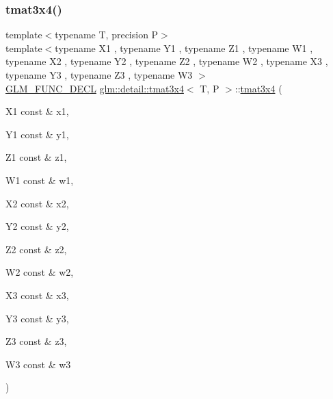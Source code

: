 \subsubsection{\texorpdfstring{tmat3x4()}{tmat3x4()}\hspace{0.1cm}{\footnotesize\ttfamily [8/22]}}
{\footnotesize\ttfamily template$<$typename T, precision P$>$ \\
template$<$typename X1 , typename Y1 , typename Z1 , typename W1 , typename X2 , typename Y2 , typename Z2 , typename W2 , typename X3 , typename Y3 , typename Z3 , typename W3 $>$ \\
\hyperlink{setup_8hpp_ab2d052de21a70539923e9bcbf6e83a51}{G\+L\+M\+\_\+\+F\+U\+N\+C\+\_\+\+D\+E\+CL} \hyperlink{structglm_1_1detail_1_1tmat3x4}{glm\+::detail\+::tmat3x4}$<$ T, P $>$\+::\hyperlink{structglm_1_1detail_1_1tmat3x4}{tmat3x4} (\begin{DoxyParamCaption}\item[{X1 const \&}]{x1,  }\item[{Y1 const \&}]{y1,  }\item[{Z1 const \&}]{z1,  }\item[{W1 const \&}]{w1,  }\item[{X2 const \&}]{x2,  }\item[{Y2 const \&}]{y2,  }\item[{Z2 const \&}]{z2,  }\item[{W2 const \&}]{w2,  }\item[{X3 const \&}]{x3,  }\item[{Y3 const \&}]{y3,  }\item[{Z3 const \&}]{z3,  }\item[{W3 const \&}]{w3 }\end{DoxyParamCaption})}

\mbox{\label{structglm_1_1detail_1_1tmat3x4_a6d3f2f2f3a7afbec8ec3b441fb904b20}} 
